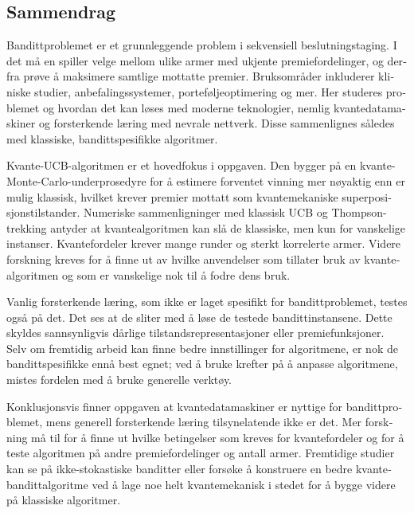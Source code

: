 \begin{otherlanguage}{norsk}

    \chapter{Sammendrag}
    Bandittproblemet er et grunnleggende problem i sekvensiell beslutningstaging.
    I det må en spiller velge mellom ulike armer med ukjente premiefordelinger, og derfra prøve å maksimere samtlige mottatte premier.
    Bruksområder inkluderer kliniske studier, anbefalingssystemer, porteføljeoptimering og mer.
    Her studeres problemet og hvordan det kan løses med moderne teknologier, nemlig kvantedatamaskiner og forsterkende læring med nevrale nettverk.
    Disse sammenlignes således med klassiske, bandittspesifikke algoritmer.

    Kvante-UCB-algoritmen er et hovedfokus i oppgaven.
    Den bygger på en kvante-Monte-Carlo-underprosedyre for å estimere forventet vinning mer nøyaktig enn er mulig klassisk, hvilket krever premier mottatt som kvantemekaniske superposisjonstilstander.
    Numeriske sammenligninger med klassisk UCB og Thompson-trekking antyder at kvantealgoritmen kan slå de klassiske, men kun for vanskelige instanser.
    Kvantefordeler krever mange runder og sterkt korrelerte armer.
    Videre forskning kreves for å finne ut av hvilke anvendelser som tillater bruk av kvantealgoritmen og som er vanskelige nok til å fodre dens bruk.

    Vanlig forsterkende læring, som ikke er laget spesifikt for bandittproblemet, testes også på det.
    Det ses at de sliter med å løse de testede bandittinstansene.
    Dette skyldes sannsynligvis dårlige tilstandsrepresentasjoner eller premiefunksjoner.
    Selv om fremtidig arbeid kan finne bedre innstillinger for algoritmene, er nok de bandittspesifikke ennå best egnet; ved å bruke krefter på å anpasse algoritmene, mistes fordelen med å bruke generelle verktøy.

    Konklusjonsvis finner oppgaven at kvantedatamaskiner er nyttige for bandittproblemet, mens generell forsterkende læring tilsynelatende ikke er det.
    Mer forskning må til for å finne ut hvilke betingelser som kreves for kvantefordeler og for å teste algoritmen på andre premiefordelinger og antall armer.
    Fremtidige studier kan se på ikke-stokastiske banditter eller forsøke å konstruere en bedre kvantebandittalgoritme ved å lage noe helt kvantemekanisk i stedet for å bygge videre på klassiske algoritmer.

\end{otherlanguage}

\cleardoublepage